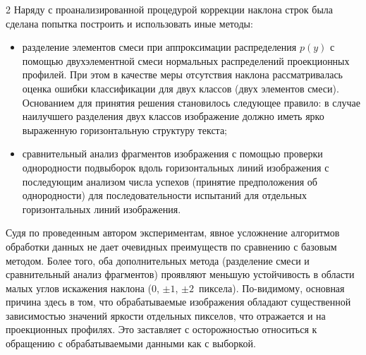 \begin{multicols}{2}
      Наряду с проанализированной процедурой коррекции наклона строк была сделана 
попытка построить и использовать иные методы:
      \begin{itemize}
\item разделение элементов смеси при аппроксимации распределения $p(y)$ с 
помощью двухэлементной смеси нормальных распределений проекционных профилей. 
При этом в качестве меры отсутствия наклона рассматривалась оценка ошибки 
классификации для двух классов (двух элементов смеси). Основанием для принятия 
решения становилось следующее правило: в случае наилучшего разделения двух 
классов изображение должно иметь ярко выраженную горизонтальную структуру 
текста;
\item сравнительный анализ фрагментов изображения с помощью проверки 
однородности подвыборок вдоль горизонтальных линий изображения с последующим 
анализом числа успехов (принятие предположения об однородности) для 
последовательности испытаний для отдельных горизонтальных линий изображения.
\end{itemize}

      Судя по проведенным автором экспериментам, явное усложнение алгоритмов 
обработки данных не дает очевидных преимуществ по сравнению с базовым методом. 
Более того, оба дополнительных метода (разделение смеси и сравнительный анализ 
фрагментов) проявляют меньшую устойчивость в области малых углов искажения 
наклона (0, $\pm1$, $\pm 2$~пиксела). По-видимому, основная причина здесь в том, что 
обрабатываемые изображения обладают существенной зависимостью значений яркости 
отдельных пикселов, что отражается и на проекционных профилях. Это заставляет с 
осторожностью относиться к обращению с обрабатываемыми данными как с выборкой. 

\renewcommand{\figurename}{\protect\bf Таблица}
\setcounter{figure}{2}
\begin{figure}[b]
\vspace*{2ex}

 \begin{center}
 \mbox{%
 \epsfxsize=154.663mm
 }
 \end{center}
 \vspace*{-9pt}
\end{figure} 

\addtocounter{table}{1}

\renewcommand{\figurename}{\protect\bf Рис.}
\renewcommand{\tablename}{\protect\bf Таблица}


\end{multicols}
